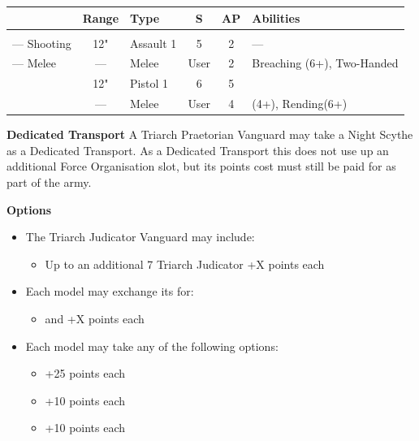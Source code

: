 \begin{minipage}[t]{0.72\textwidth}
	\begin{tabular}{L{90 pt} c C{40pt} *{2}{c} >{\raggedright\arraybackslash}p{130pt}}
		& Range & Type & S & AP & Abilities \\
		\hline
		 &  &  &  &  & \\
		— Shooting & 12" & Assault 1 & 5 & 2 & — \\
		— Melee & — & Melee & User & 2 & Breaching (6+), Two-Handed \\
		 & 12" & Pistol 1 & 6 & 5 & \\
		 & — & Melee & User & 4 &  (4+), Rending(6+) \\
	\end{tabular}
	
	\vspace*{2em}
	\textbf{Dedicated Transport}
	A Triarch Praetorian Vanguard may take a Night Scythe as a Dedicated Transport. As a Dedicated Transport this does not use up an additional Force Organisation slot, but its points cost must still be paid for as part of the army.
	
	\vspace*{2em}
	\textbf{Options}
	\begin{itemize}
		\item The Triarch Judicator Vanguard may include:
		\begin{itemize}
			\item Up to an additional 7 Triarch Judicator \dotfill +X points each
		\end{itemize}
		\item Each model may exchange its  for:
		\begin{itemize}
			\item {} and  \dotfill +X points each
		\end{itemize}
		\item Each model may take any of the following options:
		\begin{itemize}
			\item {} \dotfill +25 points each
			\item {} \dotfill +10 points each
			\item {} \dotfill +10 points each
		\end{itemize}
	\end{itemize}
\end{minipage}
\hspace{0.5em}


